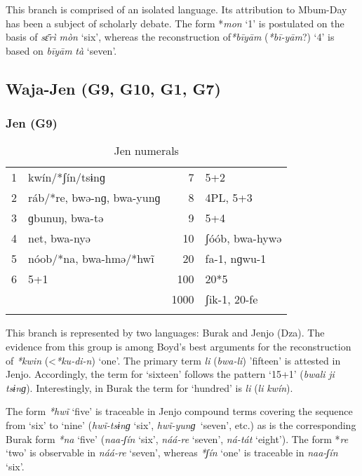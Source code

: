 This branch is comprised of an isolated language. Its attribution to Mbum-Day has been a subject of scholarly debate. The form *\textit{mon} `1' is postulated on the basis of \textit{s{\={ɛ}}rì} \textit{mòn} ‘six’, whereas the reconstruction of\textit{*b{\={i}}y{\={a}}m} (\textit{*b{\={i}}-y{\={a}}m}?) `4' is based on \textit{b{\={i}}y{\={a}}m} \textit{tà} ‘seven’.

\clearpage
\subsection{Waja-Jen (G9, G10, G1, G7)}%
\subsubsection{Jen (G9)}%
\begin{table}
\caption{\label{tab:3:113}Jen numerals}


\begin{tabularx}{\textwidth}{llrX}
\lsptoprule

1 & kwín/*ʃín/tsɨnɡ & 7 & 5+2\\
2 & ráb/*re, bwə-nɡ, bwa-yunɡ & 8 & 4PL, 5+3\\
3 & ɡbunuŋ, bwa-tə & 9 & 5+4\\
4 & net, bwa-nyə & 10 & ʃóób, bwa-hywə\\
5 & nóob/*na, bwa-hmə/*hw{\~{i}} & 20 & fa-1, nɡwu-1\\
6 & 5+1 & 100 & 20*5\\
&  & 1000 & ʃik-1, 20-fe\\
\lspbottomrule
\end{tabularx}
\end{table}

This branch is represented by two languages: Burak and Jenjo (Dza). The evidence from this group is among Boyd’s best arguments for the reconstruction of \textit{*kwin} (<\textit{*ku-di-n}) ‘one’. The primary term \textit{li} (\textit{bwa-li}) ’fifteen’ is attested in Jenjo. Accordingly, the term for ‘sixteen’ follows the pattern ‘15+1’ (\textit{bwali} \textit{ji} \textit{tsɨnɡ}). Interestingly, in Burak the term for ‘hundred’ is \textit{li} (\textit{li} \textit{kwín}).

The form \textit{*hw{\~{i}}} ‘five’ is traceable in Jenjo compound terms covering the sequence from ‘six’ to ‘nine’ (\textit{hw{\~{i}}-tsɨnɡ} ‘six’, \textit{hw{\~{i}}-yunɡ}~‘seven’, etc.) as is the corresponding Burak form \textit{*na} ‘five’ (\textit{naa-ʃín} ‘six’, \textit{náá-re} ‘seven’, \textit{ná-tát} ‘eight’). The form *\textit{re} ‘two’ is observable in \textit{náá-re} ‘seven’, whereas \textit{*ʃín} ‘one’ is traceable in \textit{naa-ʃín} ‘six’.

